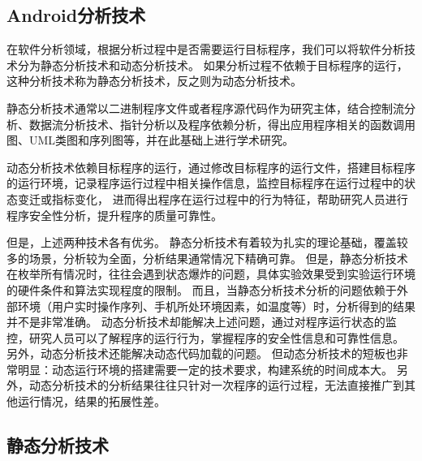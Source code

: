 \subsection{Android分析技术}

在软件分析领域，根据分析过程中是否需要运行目标程序，我们可以将软件分析技术分为静态分析技术和动态分析技术。
如果分析过程不依赖于目标程序的运行，这种分析技术称为静态分析技术，反之则为动态分析技术。

静态分析技术通常以二进制程序文件或者程序源代码作为研究主体，结合控制流分析、数据流分析技术、指针分析以及程序依赖分析，得出应用程序相关的函数调用图、UML类图和序列图等，并在此基础上进行学术研究。

动态分析技术依赖目标程序的运行，通过修改目标程序的运行文件，搭建目标程序的运行环境，记录程序运行过程中相关操作信息，监控目标程序在运行过程中的状态变迁或指标变化，
进而得出程序在运行过程中的行为特征，帮助研究人员进行程序安全性分析，提升程序的质量可靠性。




但是，上述两种技术各有优劣。
静态分析技术有着较为扎实的理论基础，覆盖较多的场景，分析较为全面，分析结果通常情况下精确可靠。
但是，静态分析技术在枚举所有情况时，往往会遇到状态爆炸的问题，具体实验效果受到实验运行环境的硬件条件和算法实现程度的限制。
而且，当静态分析技术分析的问题依赖于外部环境（用户实时操作序列、手机所处环境因素，如温度等）时，分析得到的结果并不是非常准确。
动态分析技术却能解决上述问题，通过对程序运行状态的监控，研究人员可以了解程序的运行行为，掌握程序的安全性信息和可靠性信息。
另外，动态分析技术还能解决动态代码加载的问题。
但动态分析技术的短板也非常明显：动态运行环境的搭建需要一定的技术要求，构建系统的时间成本大。
另外，动态分析技术的分析结果往往只针对一次程序的运行过程，无法直接推广到其他运行情况，结果的拓展性差。




\subsection{静态分析技术}


